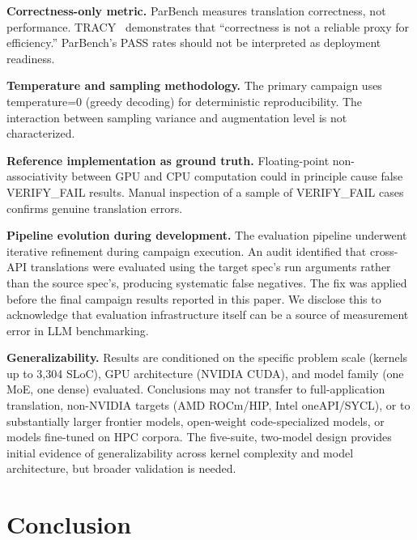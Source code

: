 \documentclass[conference]{IEEEtran}
\newcommand{\pending}[1]{\textit{Provided in Artifact Description appendix}}
\begin{document}
\textbf{Correctness-only metric.} ParBench measures translation correctness, not performance. TRACY~\cite{TRACY2025} demonstrates that ``correctness is not a reliable proxy for efficiency.'' ParBench's PASS rates should not be interpreted as deployment readiness.

\textbf{Temperature and sampling methodology.} The primary campaign uses temperature=0 (greedy decoding) for deterministic reproducibility. The interaction between sampling variance and augmentation level is not characterized.

\textbf{Reference implementation as ground truth.} Floating-point non-associativity between GPU and CPU computation could in principle cause false VERIFY\_FAIL results. Manual inspection of a sample of VERIFY\_FAIL cases confirms genuine translation errors.

\textbf{Pipeline evolution during development.} The evaluation pipeline underwent iterative refinement during campaign execution. An audit identified that cross-API translations were evaluated using the target spec's run arguments rather than the source spec's, producing systematic false negatives. The fix was applied before the final campaign results reported in this paper. We disclose this to acknowledge that evaluation infrastructure itself can be a source of measurement error in LLM benchmarking.

\textbf{Generalizability.} Results are conditioned on the specific problem scale (kernels up to 3,304 SLoC), GPU architecture (NVIDIA CUDA), and model family (one MoE, one dense) evaluated. Conclusions may not transfer to full-application translation, non-NVIDIA targets (AMD ROCm/HIP, Intel oneAPI/SYCL), or to substantially larger frontier models, open-weight code-specialized models, or models fine-tuned on HPC corpora. The five-suite, two-model design provides initial evidence of generalizability across kernel complexity and model architecture, but broader validation is needed.

\section{Conclusion}
\label{sec:conclusion}
\end{document}
